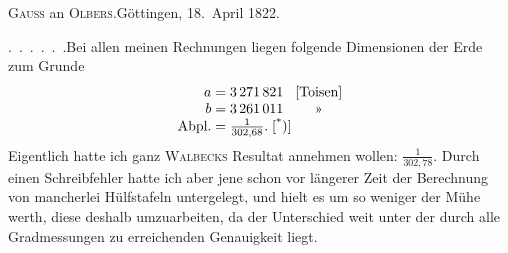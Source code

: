 \begin{center}
\textsc{Gauss} an \textsc{Olbers}.\quad Göttingen, 18.~April 1822.
\end{center}

\par\noindent\hspace*{\parindent}.\ .\ .\ .\ .\ .\quad Bei allen meinen Rechnungen liegen folgende Dimensionen der
Erde zum Grunde
\[
\begin{array}{@{}r@{\;}c@{\;}l@{\;}c@{}}
a & = & 3\,271\,821 & \text{[Toisen]} \\
b & = & 3\,261\,011 & \text{»} \\
\text{Abpl.} & = & \tfrac{1}{302{,}68}.\;\text{[\textsuperscript{*})]} &
\end{array}
\]
Eigentlich hatte ich ganz \textsc{Walbecks} Resultat annehmen wollen: \(\frac{1}{302{,}78}\).
Durch einen Schreibfehler hatte ich aber jene schon vor längerer Zeit der Berechnung
von mancherlei Hülfstafeln untergelegt, und hielt es um so weniger der Mühe
werth, diese deshalb umzuarbeiten, da der Unterschied weit unter der durch
alle Gradmessungen zu erreichenden Genauigkeit liegt.
